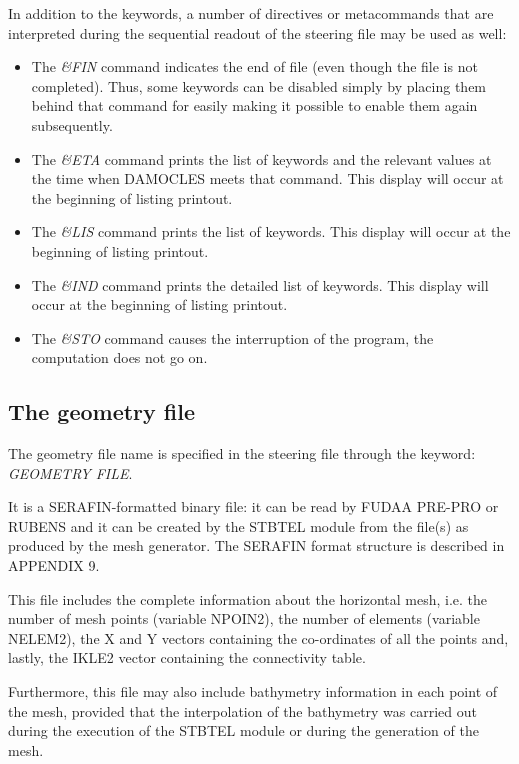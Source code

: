  In addition to the keywords, a number of directives or metacommands that are interpreted during the sequential readout of the steering file may be used as well:

\begin{itemize}
\item  The \textit{\&FIN} command indicates the end of file (even though the file is not completed). Thus, some keywords can be disabled simply by placing them behind that command for easily making it possible to enable them again subsequently.

\item  The \textit{\&ETA} command prints the list of keywords and the relevant values at the time when DAMOCLES meets that command. This display will occur at the beginning of listing printout.

\item  The \textit{\&LIS} command prints the list of keywords. This display will occur at the beginning of listing printout.

\item  The \textit{\&IND} command prints the detailed list of keywords. This display will occur at the beginning of listing printout.

\item  The \textit{\&STO} command causes the interruption of the program, the computation does not go on.
\end{itemize}


\subsection{ The geometry file}

 The geometry file name is specified in the steering file through the keyword: \textit{GEOMETRY FILE}.

 It is a SERAFIN-formatted binary file: it can be read by FUDAA PRE-PRO or RUBENS and it can be created by the STBTEL module from the file(s) as produced by the mesh generator. The SERAFIN format structure is described in APPENDIX 9.

 This file includes the complete information about the horizontal mesh, i.e. the number of mesh points (variable NPOIN2), the number of elements (variable NELEM2), the X and Y vectors containing the co-ordinates of all the points and, lastly, the IKLE2 vector containing the connectivity table.

 Furthermore, this file may also include bathymetry information in each point of the mesh, provided that the interpolation of the bathymetry was carried out during the execution of the STBTEL module or during the generation of the mesh.

